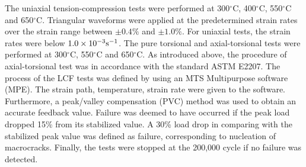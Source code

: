 
The uniaxial tension-compression tests were performed at 300$^\circ$C, 400$^\circ$C, 550$^\circ$C and 650$^\circ$C.
Triangular waveforms were applied at the predetermined strain rates over the strain range between $\pm 0.4\%$ and $\pm 1.0\%$.
For uniaxial tests, the strain rates were below $1.0\times 10^{-3}\rm{s}^{-1}$.
The pure torsional and axial-torsional tests were performed at 300$^\circ$C, 550$^\circ$C and 650$^\circ$C.
As introduced above, the procedure of axial-torsional test was in accordance with the standard ASTM E2207.
The process of the LCF tests was defined by using an MTS Multipurpose software (MPE).
The strain path, temperature, strain rate were given to the software.
Furthermore, a peak/valley compensation (PVC) method was used to obtain an accurate feedback value.
Failure was deemed to have occurred if the peak load dropped 15\% from its stabilized value. A 30\% load drop in comparing with the stabilized peak value was defined as failure, corresponding to nucleation of macrocracks.
Finally, the tests were stopped at the 200,000 cycle if no failure was detected.


